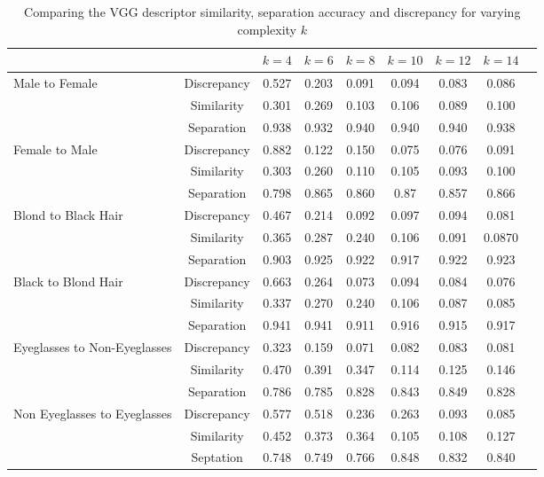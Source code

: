 \documentclass{article} %
\begin{document}
\begin{table}[H]
\centering
\caption{Comparing the VGG descriptor similarity, separation accuracy and discrepancy for varying complexity $k$}
\label{tab:var_layers_value}
\begin{tabular}{lcccccccc}
                             & & $k=4$     & $k=6$     & $k=8$     & $k=10$     & $k=12$     & $k=14$     \\
\midrule
Male to Female               & Discrepancy & 0.527 & 0.203  & 0.091 & 0.094 & 0.083 & 0.086 \\
                            &  Similarity  & 0.301 & 0.269 &  0.103  & 0.106 & 0.089 & 0.100   \\
			    &	Separation       & 0.938 & 0.932 & 0.940 & 0.940  & 0.940  & 0.938 \\
\midrule
Female to Male              & Discrepancy  & 0.882 & 0.122  & 0.150  & 0.075 & 0.076 & 0.091 \\                  
                            &   Similarity  & 0.303  & 0.260  & 0.110  & 0.105 & 0.093 & 0.100  \\
			   & Separation     & 0.798 & 0.865 & 0.860 & 0.87  & 0.857 & 0.866 \\
\midrule
Blond to Black Hair        & Discrepancy   & 0.467 & 0.214 & 0.092 & 0.097 & 0.094 & 0.081 \\
                             & Similarity  & 0.365 & 0.287 & 0.240  & 0.106 & 0.091 &   0.0870    \\
			     &	Separation & 0.903 & 0.925 & 0.922 & 0.917 & 0.922 &   0.923    \\
\midrule
Black to Blond Hair          & Discrepancy & 0.663 & 0.264 & 0.073 & 0.094 & 0.084 & 0.076 \\
                             & Similarity   & 0.337 & 0.270  & 0.240  & 0.106 & 0.087 &   0.085    \\
			     & Separation   & 0.941 & 0.941 & 0.911 & 0.916 & 0.915 &  0.917     \\
\midrule
Eyeglasses to Non-Eyeglasses & Discrepancy & 0.323 & 0.159 & 0.071 & 0.082 & 0.083 & 0.081 \\
			     & Similarity & 0.470  & 0.391 & 0.347 & 0.114 & 0.125 & 0.146 \\
			     & Separation & 0.786 & 0.785 & 0.828 & 0.843 & 0.849 & 0.828 \\
\midrule
Non Eyeglasses to Eyeglasses & Discrepancy & 0.577 & 0.518 & 0.236 & 0.263 & 0.093 & 0.085 \\
		              & Similarity & 0.452 & 0.373 & 0.364 & 0.105 & 0.108 & 0.127 \\
			      & Septation & 0.748 & 0.749 & 0.766 & 0.848 & 0.832 & 0.840  \\
\bottomrule      
\end{tabular}
\end{table}
\end{document}
